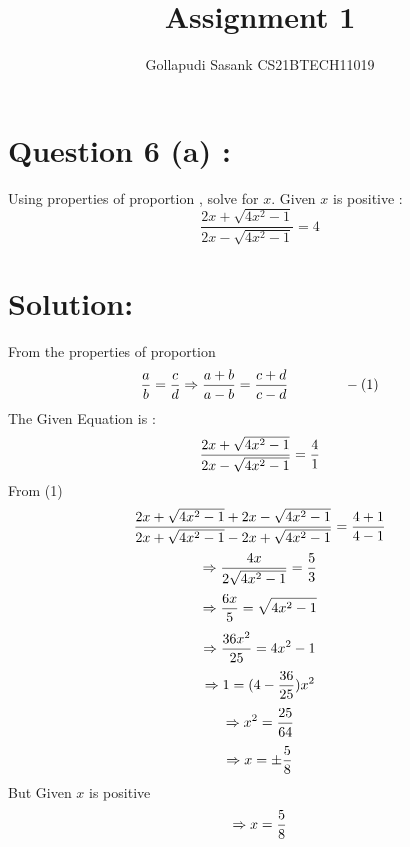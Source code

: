 \documentclass[twocolumn]{article}
\title{Assignment 1}
\author{Gollapudi Sasank CS21BTECH11019}
\begin{document}
\maketitle
\section*{ Question 6 (a) :}
\noindent Using properties of proportion , solve for $x$. Given $x$ is positive :
\begin{equation*}
\frac{2x+\sqrt{4x^2-1}}{2x-\sqrt{4x^2-1}} = 4 
\end{equation*}

\section*{Solution:}
From the properties of proportion \\ 
\begin{equation*}
     \frac{a}{b}  =  \frac{c}{d} 
     \Rightarrow 
     \frac{a+b}{a-b} = \frac{c+d}{c-d} \hspace{40pt} -(1) \\
\end{equation*}
The Given Equation is :
    \begin{equation*}
    \centering
        \frac{2x+\sqrt{4x^2-1}}{2x-\sqrt{4x^2-1}} = \frac {4}{1}
    \end{equation*}
    From (1) 
\begin{equation*}
        \frac {2x+\sqrt{4x^2-1}+2x-\sqrt{4x^2-1}}{2x+\sqrt{4x^2-1}-2x+\sqrt{4x^2-1}} = \frac {4+1}{4-1} \\
\end{equation*}
\begin{equation*}
        \Rightarrow
        \frac{4x}{2\sqrt{4x^2-1}} = \frac {5}{3} \\
\end{equation*}
\begin{equation*}
        \Rightarrow
        \frac{6x}{5} = \sqrt{4x^2-1} \\
\end{equation*}
\begin{equation*}
    \Rightarrow
        \frac{36x^2}{25} = 4x^2-1 \\
\end{equation*}
\begin{equation*}
        \Rightarrow
        1 = (4 - \frac{36}{25} )  x^2 \\
\end{equation*}
\begin{equation*}
    \Rightarrow
    x^2 =\frac{25}{64} \\ \\ \\ 
\end{equation*}
\begin{equation*}
    \Rightarrow
    x = \pm\frac{5}{8} \\
\end{equation*}
But Given $x$ is positive 
\begin{equation*}
  \Rightarrow x = \frac{5}{8} \\  
\end{equation*}
\end{document}
